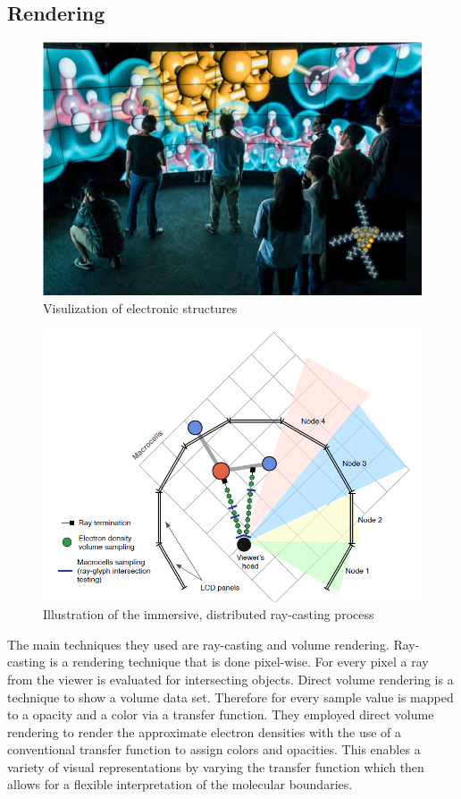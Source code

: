\documentclass[10pt,twocolumn,letterpaper]{article}
\begin{document}
\subsection{Rendering}
\begin{figure}
	\includegraphics{atomistic_4.png}
	\caption{Visulization of electronic structures}
	\label{img:atomistic1}
\end{figure}
\begin{figure}
	\includegraphics{atomistic_6.png}
	\caption{Illustration of the immersive, distributed ray-casting process}
	\label{img:atomistic2}
\end{figure}
The main techniques they used are ray-casting and volume rendering. Ray-casting is a rendering technique that is done pixel-wise. For every pixel a ray from the viewer is evaluated for intersecting objects. Direct volume rendering is a technique to show a volume data set. Therefore for every sample value is mapped to a opacity and a color via a transfer function. They employed  direct volume rendering to render the approximate electron densities with the use of a conventional transfer function to assign colors and opacities. This enables  a variety of visual representations by varying the transfer function which then allows for a flexible interpretation of the molecular boundaries.
\end{document}
